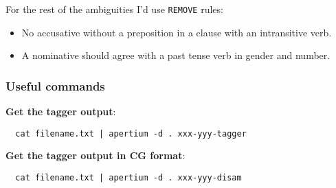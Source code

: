 \documentclass[10pt,xetex]{beamer} %
\begin{document}
\begin{frame}

For the rest of the ambiguities I'd use \texttt{REMOVE} rules:

\begin{itemize}
  \item No accusative without a preposition in a clause with an intransitive verb.
  \item A nominative should agree with a past tense verb in gender and number.
\end{itemize}

\end{frame}


\begin{frame}[fragile]
  \frametitle{Useful commands}

{\bf Get the tagger output}:

\begin{verbatim}
  cat filename.txt | apertium -d . xxx-yyy-tagger
\end{verbatim}

{\bf Get the tagger output in CG format}:

\begin{verbatim}
  cat filename.txt | apertium -d . xxx-yyy-disam
\end{verbatim}

\end{frame}
\end{document}
